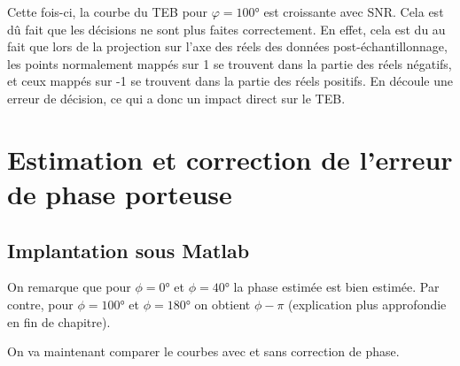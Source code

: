 \documentclass[11pt,a4paper]{report}
\begin{document}

Cette fois-ci, la courbe du TEB pour $\varphi = 100$° est croissante avec SNR. Cela est dû fait que les décisions ne sont plus faites correctement. En effet, cela est du au fait que lors de la projection sur l'axe des réels des données post-échantillonnage, les points normalement mappés sur 1 se trouvent dans la partie des réels négatifs, et ceux mappés sur -1 se trouvent dans la partie des réels positifs. En découle une erreur de décision, ce qui a donc un impact direct sur le TEB.



\part{Estimation et correction de l’erreur de phase porteuse}



\chapter{Implantation sous Matlab}


\begin{table}[H]
        \centering
        \fontsize{12}{20}\selectfont
        \caption{Comparaison de la phase appliquée et celle estimée pour la démodulation (en °)}
        \label{tableau_power}
\end{table}

On remarque que pour $\phi = 0°$ et $\phi = 40°$ la phase estimée est bien estimée. Par contre, pour $\phi = 100°$ et $\phi = 180°$ on obtient $\phi - \pi$ (explication plus approfondie en fin de chapitre).



\vspace{0.3cm}

On va maintenant comparer le courbes avec et sans correction de phase.
\end{document}
